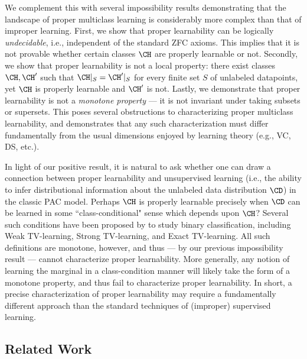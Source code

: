 \documentclass[11pt]{article}
\begin{document}
We complement this with several impossibility results demonstrating that the landscape of proper multiclass learning is considerably more complex than that of improper learning. First, we show that proper learnability can be logically \emph{undecidable}, i.e., independent of the standard ZFC axioms. This implies that it is not provable whether certain classes $\CH$ are properly learnable or not. Secondly, we show that proper learnability is not a local property: there exist classes $\CH, \CH'$ such that $\CH|_S = \CH'|_S$ for every finite set $S$ of unlabeled datapoints, yet $\CH$ is properly learnable and $\CH'$ is not. Lastly, we demonstrate that proper learnability is not a \emph{monotone property} --- it is not invariant under taking subsets or supersets. This poses several obstructions to characterizing proper multiclass learnability, and demonstrates that any such characterization must differ fundamentally from the usual dimensions enjoyed by learning theory (e.g., VC, DS, etc.). 

In light of our positive result, it is natural to ask whether one can draw a connection between proper learnability and unsupervised learning (i.e., the ability to infer distributional information about the unlabeled data distribution $\CD$) in the classic PAC model. Perhaps $\CH$ is properly learnable precisely when $\CD$ can be learned in some ``class-conditional" sense which depends upon $\CH$? Several such conditions have been proposed by \cite{hopkins2023pac} to study binary classification, including Weak TV-learning, Strong TV-learning, and Exact TV-learning. All such definitions are monotone, however, and thus --- by our previous impossibility result --- cannot characterize proper learnability. More generally, any notion of learning the marginal in a class-condition manner will likely take the form of a monotone property, and thus fail to characterize proper learnability. In short, a precise characterization of proper learnability may require a fundamentally different approach than the standard techniques of (improper) supervised learning. 

\subsection{Related Work}
\end{document}

